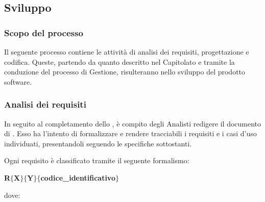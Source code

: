 \subsection{Sviluppo} \label{sviluppo}

	\subsubsection{Scopo del processo}

		Il seguente processo contiene le attività di analisi dei requisiti, progettazione e codifica. Queste,
		partendo da quanto descritto nel Capitolato e tramite la conduzione del processo di Gestione,
		risulteranno nello sviluppo del prodotto software.

    \subsubsection{Analisi dei requisiti}

        In seguito al completamento dello \StudioFattibilita{}, è compito degli Analisti redigere il documento di
        \AnalisiRequisiti . Esso ha l'intento di formalizzare e rendere tracciabili i requisiti e i casi d'uso individuati,
        presentandoli seguendo le specifiche sottostanti.
			

            Ogni requisito è classificato tramite il seguente formalismo:

                \begin{center}
                    \textbf{R$\{$X$\}$$\{$Y$\}$$\{$codice\_identificativo$\}$}
                \end{center}

            dove:

